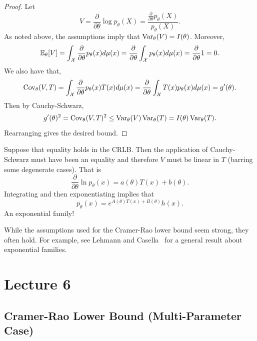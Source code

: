 \begin{proof}
	Let
	\[
	V
	=
	\frac{\partial}{\partial\theta}\log p_\theta(X)
	=
	\frac{\frac{\partial}{\partial\theta}p_\theta(X)}{p_\theta(X)}.
	\]
	As noted above, the assumptions imply that $\operatorname{Var}_\theta(V) = I(\theta)$. Moreover, \[
		\mathbb{E}_\theta[V] = \int _{\mathcal X}  \frac{\partial}{\partial\theta} p_\theta(x) d\mu(x) =  \frac{\partial}{\partial\theta} \int _{\mathcal X}  p_\theta(x) d\mu(x) = \frac{\partial}{\partial\theta} 1 = 0.
	\] We also have that, \[
		\operatorname{Cov}_\theta(V, T) = \int_{\mathcal{X}}  \frac{\partial}{\partial\theta} p_\theta(x) T(x) d\mu(x) = \frac{\partial}{\partial\theta}  \int_{\mathcal{X}} T(x) p_\theta(x) d\mu(x) = g'(\theta).
	\] Then by Cauchy-Schwarz, \[
		 g'(\theta)^2 = \operatorname{Cov}_\theta(V, T)^2 \le \operatorname{Var}_\theta(V) \operatorname{Var}_\theta(T) = I(\theta) \operatorname{Var}_\theta(T).
	\] Rearranging gives the desired bound.
\end{proof}

\begin{remark}
Suppose that equality holds in the CRLB. Then the application of Cauchy-Schwarz must have been an equality and therefore $V$ must be linear in $T$ (barring some degenerate cases). That is \[
	 \frac{\partial}{\partial\theta} \ln p_\theta(x) = a(\theta) T(x) + b(\theta).
\] Integrating and then exponentiating implies that \[
	p_\theta(x) = e^{A(\theta) T(x) + B(\theta)} h(x).
\] An exponential family! 
\end{remark}

\begin{remark}
	While the assumptions used for the Cramer-Rao lower bound seem strong, they often hold. For example, see Lehmann and Casella~\cite[Theorem 1.5.8, p.~27]{LehmannCasella1998} for a general result about exponential families.
\end{remark}


\newpage

\section{Lecture 6}

\subsection{Cramer-Rao Lower Bound (Multi-Parameter Case)}

